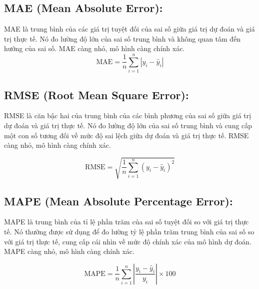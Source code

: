 \subsection*{MAE (Mean Absolute Error):}
MAE là trung bình của các giá trị tuyệt đối của sai số giữa giá trị dự đoán và giá trị thực tế. Nó đo lường độ lớn của sai số trung bình và không quan tâm đến hướng của sai số. MAE càng nhỏ, mô hình càng chính xác.
\begin{equation}
\text{MAE} = \frac{1}{n} \sum_{i=1}^{n} \left| y_i - \hat{y}_i \right|
\end{equation}

\subsection*{RMSE (Root Mean Square Error):}
RMSE là căn bậc hai của trung bình của các bình phương của sai số giữa giá trị dự đoán và giá trị thực tế. Nó đo lường độ lớn của sai số trung bình và cung cấp một con số tương đối về mức độ sai lệch giữa dự đoán và giá trị thực tế. RMSE càng nhỏ, mô hình càng chính xác.

\begin{equation}
\text{RMSE} = \sqrt{\frac{1}{n} \sum_{i=1}^{n} (y_i - \hat{y}_i)^2}
\end{equation}

\subsection*{MAPE (Mean Absolute Percentage Error):}
MAPE là trung bình của tỉ lệ phần trăm của sai số tuyệt đối so với giá trị thực tế. Nó thường được sử dụng để đo lường tỷ lệ phần trăm trung bình của sai số so với giá trị thực tế, cung cấp cái nhìn về mức độ chính xác của mô hình dự đoán. MAPE càng nhỏ, mô hình càng chính xác.

\begin{equation}
\text{MAPE} = \frac{1}{n} \sum_{i=1}^{n} \left| \frac{y_i - \hat{y}_i}{y_i} \right| \times 100
\end{equation}
\vspace{0.1cm}